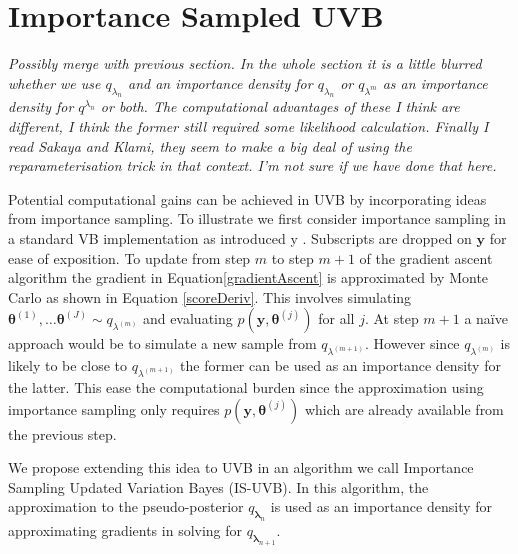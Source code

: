 \documentclass[12pt,a4paper]{article}\usepackage[]{graphicx}\usepackage[]{color}
\begin{document}
\section{Importance Sampled UVB} 
\label{sec:UVBIS}
{\color{blue}
{\em Possibly merge with previous section.  In the whole section it is a little blurred whether we use $q_{\lambda_{n}}$ and an importance density for $q_{\lambda_{n}}$ or $q_{\lambda^m}$ as an importance density for $q^{\lambda_{n}}$ or both.  The computational advantages of these I think are different, I think the former still required some likelihood calculation.  Finally I read Sakaya and Klami, they seem to make a big deal of using the reparameterisation trick in that context.  I'm not sure if we have done that here.}


Potential computational gains can be achieved in UVB by incorporating ideas from importance sampling.  To illustrate we first consider importance sampling in a standard VB implementation as introduced y \cite{Sakaya2017}. Subscripts are dropped on $\bm{y}$ for ease of exposition.  To update from step $m$ to step $m+1$ of the gradient ascent algorithm the gradient in Equation\ref{gradientAscent} is approximated by Monte Carlo as shown in Equation \ref{scoreDeriv}.  This involves simulating ${\bm \theta}^{(1)},\ldots{\bm{\theta}}^{(J)}\sim q_{\lambda^{(m)}}$ and evaluating $p({\bm y}, {\bm \theta^{(j)}})$ for all $j$.  At step $m+1$ a na\"ive approach would be to simulate a new sample from  $q_{\lambda^{(m+1)}}$.  However since $q_{\lambda^{(m)}}$ is likely to be close to $q_{\lambda^{(m+1)}}$ the former can be used as an importance density for the latter.  This ease the computational burden since the approximation using importance sampling only requires $p({\bm y}, {\bm \theta^{(j)}})$ which are already available from the previous step.

We propose extending this idea to UVB in an algorithm we call Importance Sampling Updated Variation Bayes (IS-UVB).  In this algorithm, the approximation to the pseudo-posterior $q_{{\bm\lambda}_n}$ is used as an importance density for approximating gradients in solving for $q_{\bm\lambda_{n+1}}$.

}
\end{document}
